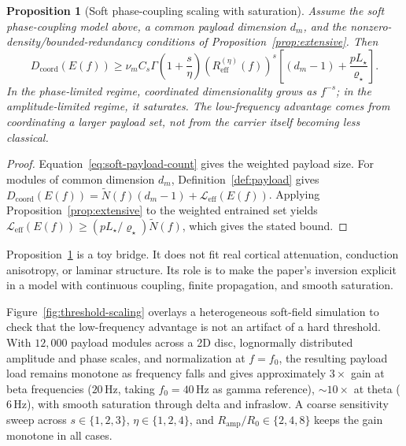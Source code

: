 \documentclass[11pt,a4paper]{article}
\newtheorem{proposition}[theorem]{Proposition}
\theoremstyle{definition}
\theoremstyle{remark}
\begin{document}
\begin{proposition}[Soft phase-coupling scaling with saturation]
\label{prop:threshold-scaling}
Assume the soft phase-coupling model above, a common payload dimension $d_m$, and the nonzero-density/bounded-redundancy conditions of Proposition~\ref{prop:extensive}. Then
\begin{equation}
D_{\mathrm{coord}}(E(f))
\ge
\nu_m C_s \Gamma\!\left(1+\frac{s}{\eta}\right)
\left(R_{\mathrm{eff}}^{(\eta)}(f)\right)^s
\left[(d_m-1)+\frac{pL_\star}{\varrho_\star}\right].
\end{equation}
In the phase-limited regime, coordinated dimensionality grows as $f^{-s}$; in the amplitude-limited regime, it saturates. The low-frequency advantage comes from coordinating a larger payload set, not from the carrier itself becoming less classical.
\end{proposition}

\begin{proof}
Equation~\eqref{eq:soft-payload-count} gives the weighted payload size. For modules of common dimension $d_m$, Definition~\ref{def:payload} gives $D_{\mathrm{coord}}(E(f))=\widetilde N(f)(d_m-1)+\mathcal{L}_{\mathrm{eff}}(E(f))$. Applying Proposition~\ref{prop:extensive} to the weighted entrained set yields $\mathcal{L}_{\mathrm{eff}}(E(f))\ge (pL_\star/\varrho_\star)\widetilde N(f)$, which gives the stated bound.
\end{proof}

Proposition~\ref{prop:threshold-scaling} is a toy bridge. It does not fit real cortical attenuation, conduction anisotropy, or laminar structure. Its role is to make the paper's inversion explicit in a model with continuous coupling, finite propagation, and smooth saturation.

Figure~\ref{fig:threshold-scaling} overlays a heterogeneous soft-field simulation to check that the low-frequency advantage is not an artifact of a hard threshold. With $12{,}000$ payload modules across a 2D disc, lognormally distributed amplitude and phase scales, and normalization at $f=f_0$, the resulting payload load remains monotone as frequency falls and gives approximately $3\times$ gain at beta frequencies ($20$\,Hz, taking $f_0=40$\,Hz as gamma reference), $\sim\!10\times$ at theta ($6$\,Hz), with smooth saturation through delta and infraslow. A coarse sensitivity sweep across $s\in\{1,2,3\}$, $\eta\in\{1,2,4\}$, and $R_{\mathrm{amp}}/R_0\in\{2,4,8\}$ keeps the gain monotone in all cases.
\end{document}
